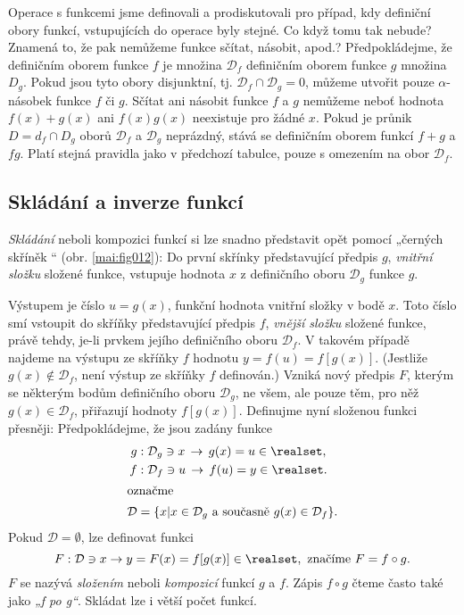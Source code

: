       Operace s funkcemi jsme definovali a prodiskutovali pro případ, kdy definiční obory funkcí, 
      vstupujících do operace byly stejné. Co když tomu tak nebude? Znamená to, že pak nemůžeme 
      funkce sčítat, násobit, apod.? Předpokládejme, že definičním oborem funkce \(f\) je množina 
      \(\mathcal{D}_f\) definičním oborem funkce \(g\) množina \(D_g\). Pokud jsou tyto obory 
      disjunktní, tj. \(\mathcal{D}_f \cap \mathcal{D}_g = 0\), můžeme utvořit pouze 
      \(\alpha\)-násobek funkce \(f\) či \(g\). Sčítat ani násobit funkce \(f\) a \(g\) nemůžeme 
      neboť hodnota \(f(x) + g(x)\) ani \(f(x)g(x)\) neexistuje pro žádné \(x\). Pokud je průnik 
      \(D=d_f\cap D_g\) oborů \(\mathcal{D}_f\) a \(\mathcal{D}_g\) neprázdný, stává se definičním 
      oborem funkcí \(f+g\) a \(fg\). Platí stejná pravidla jako v předchozí tabulce, pouze s 
      omezením na obor \(\mathcal{D}_f\).
    
    \subsection{Skládání a inverze funkcí}\label{mai:IchapIIIsecIssecV}
      \emph{Skládání} neboli kompozici funkcí si lze snadno představit opět pomocí „černých skříněk
      “ (obr. \ref{mai:fig012}): Do první skřínky představující předpis \(g\), \emph{vnitřní složku}
      složené funkce, vstupuje hodnota \(x\) z definičního oboru \(\mathcal{D}_g\) funkce \(g\).


      Výstupem je číslo \(u = g(x)\), funkční hodnota vnitřní složky v bodě \(x\). Toto číslo smí
      vstoupit do skříňky představující předpis \(f\), \emph{vnější složku} složené funkce, právě
      tehdy, je-li prvkem jejího definičního oboru \(\mathcal{D}_f\). V takovém případě najdeme na
      výstupu ze skříňky \(f\) hodnotu \(y = f(u) = f[g(x)]\). (Jestliže
      \(g(x)\notin\mathcal{D}_f\), není výstup ze skříňky \(f\) definován.) Vzniká nový předpis
      \(F\), kterým se některým bodům definičního oboru \(\mathcal{D}_g\), ne všem, ale pouze těm,
      pro něž \(g(x)\in\mathcal{D}_f\), přiřazují hodnoty \(f[g(x)]\). Definujme nyní složenou
      funkci přesněji: Předpokládejme, že jsou zadány funkce
      \begin{align*}
        g  &: \mathcal{D}_g\ni x\,\rightarrow\, g(x) = u\in\realset, \\
        f  &: \mathcal{D}_f\ni u\,\rightarrow\, f(u) = y\in\realset. \\
        \shortintertext{označme}
        \mathcal{D} &= \{x\lvert x\in\mathcal{D}_g \text{ a současně } g(x)\in\mathcal{D}_f\}.
      \end{align*}
      Pokud \(\mathcal{D} = \emptyset\), lze definovat funkci
      \begin{equation*}
        F: \mathcal{D}\ni x\rightarrow y = F(x) = f[g(x)]\in\realset, 
           \text{ značíme } F = f \circ g.
      \end{equation*}
      \(F\) se nazývá \emph{složením} neboli \emph{kompozicí} funkcí \(g\) a \(f\). Zápis \(f\circ 
      g\) čteme často také jako \emph{„f po g“}. Skládat lze i větší počet funkcí.


